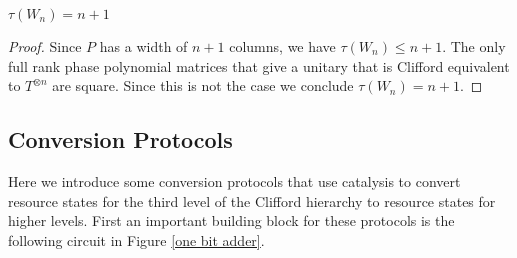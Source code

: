 \documentclass[12pt]{dalthesis}
\begin{document}
\begin{lemma}
$\tau (W_n) = n + 1$
\end{lemma}
\begin{proof}
Since $P$ has a width of $n+1$ columns, we have $\tau (W_n) \leq n+1$. The only full rank phase polynomial matrices that give a unitary that is Clifford equivalent to $T^{\otimes n}$ are square. Since this is not the case we conclude $\tau (W_n) = n + 1$.
\end{proof}

\subsection{Conversion Protocols}
Here we introduce some conversion protocols that use catalysis to convert resource states for the third level of the Clifford hierarchy to resource states for higher levels. First an important building block for these protocols is the following circuit in Figure \ref{one bit adder}.

\vspace{2mm}
\end{document}
